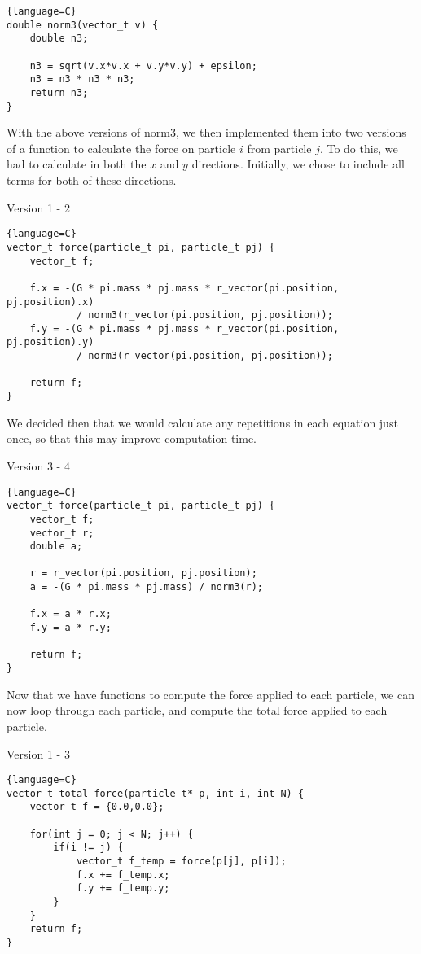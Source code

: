 \documentclass[12pt]{article}
\begin{document}
\begin{lstlisting}{language=C}
double norm3(vector_t v) {
    double n3;

    n3 = sqrt(v.x*v.x + v.y*v.y) + epsilon; 
    n3 = n3 * n3 * n3; 
    return n3;
}
\end{lstlisting}
With the above versions of norm3, we then implemented them into two versions of a function to calculate the force on particle $i$ from particle $j$. To do this, we had to calculate in both the $x$ and $y$ directions. Initially, we chose to include all terms for both of these directions.
\begin{center}
    Version 1 - 2
\end{center}
\begin{lstlisting}{language=C}
vector_t force(particle_t pi, particle_t pj) {
    vector_t f;

    f.x = -(G * pi.mass * pj.mass * r_vector(pi.position, pj.position).x) 
            / norm3(r_vector(pi.position, pj.position));
    f.y = -(G * pi.mass * pj.mass * r_vector(pi.position, pj.position).y) 
            / norm3(r_vector(pi.position, pj.position));

    return f;
}
\end{lstlisting}
We decided then that we would calculate any repetitions in each equation just once, so that this may improve computation time. 
\begin{center}
    Version 3 - 4
\end{center}
\begin{lstlisting}{language=C}
vector_t force(particle_t pi, particle_t pj) {
    vector_t f;
    vector_t r;
    double a;

    r = r_vector(pi.position, pj.position);
    a = -(G * pi.mass * pj.mass) / norm3(r);

    f.x = a * r.x;
    f.y = a * r.y;

    return f;
}
\end{lstlisting}
Now that we have functions to compute the force applied to each particle, we can now loop through each particle, and compute the total force applied to each particle. 
\begin{center}
    Version 1 - 3
\end{center}
\begin{lstlisting}{language=C}
vector_t total_force(particle_t* p, int i, int N) {
    vector_t f = {0.0,0.0};
    
    for(int j = 0; j < N; j++) {
        if(i != j) {
            vector_t f_temp = force(p[j], p[i]);
            f.x += f_temp.x;
            f.y += f_temp.y;
        }
    }
    return f;
}
\end{lstlisting}
\end{document}
